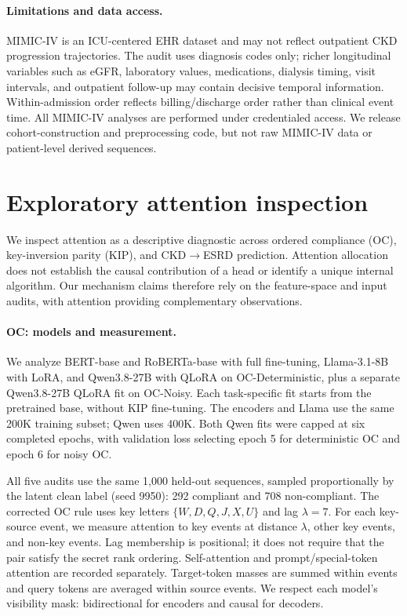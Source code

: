 \documentclass{article} %
\theoremstyle{plain}
\theoremstyle{definition}
\theoremstyle{remark}
\begin{document}
\paragraph{Limitations and data access.}
MIMIC-IV is an ICU-centered EHR dataset and may not reflect outpatient CKD progression trajectories. The audit uses diagnosis codes only; richer longitudinal variables such as eGFR, laboratory values, medications, dialysis timing, visit intervals, and outpatient follow-up may contain decisive temporal information. Within-admission order reflects billing/discharge order rather than clinical event time. All MIMIC-IV analyses are performed under credentialed access. We release cohort-construction and preprocessing code, but not raw MIMIC-IV data or patient-level derived sequences.

\section{Exploratory attention inspection}
\label{appendix:attention}

We inspect attention as a descriptive diagnostic across ordered compliance (OC), key-inversion parity (KIP), and CKD$\to$ESRD prediction. Attention allocation does not establish the causal contribution of a head or identify a unique internal algorithm. Our mechanism claims therefore rely on the feature-space and input audits, with attention providing complementary observations.

\paragraph{OC: models and measurement.}
We analyze BERT-base and RoBERTa-base with full fine-tuning, Llama-3.1-8B with LoRA, and Qwen3.8-27B with QLoRA on OC-Deterministic, plus a separate Qwen3.8-27B QLoRA fit on OC-Noisy. Each task-specific fit starts from the pretrained base, without KIP fine-tuning. The encoders and Llama use
the same 200K training subset; Qwen uses 400K. Both Qwen fits were capped at six completed epochs, with validation loss selecting epoch 5 for deterministic OC and epoch 6 for noisy OC.

All five audits use the same 1,000 held-out sequences, sampled proportionally by the latent clean label (seed 9950): 292 compliant and 708 non-compliant. The corrected OC rule uses key letters $\{W,D,Q,J,X,U\}$ and lag $\lambda=7$. For each key-source event, we measure attention to key events at distance $\lambda$, other key events, and non-key events. Lag membership is positional; it does not require that the pair satisfy the secret rank ordering. Self-attention and prompt/special-token attention are recorded separately. Target-token masses are summed within events and query tokens are averaged within source events. We respect each model's visibility mask: bidirectional for encoders and causal for decoders.
\end{document}
